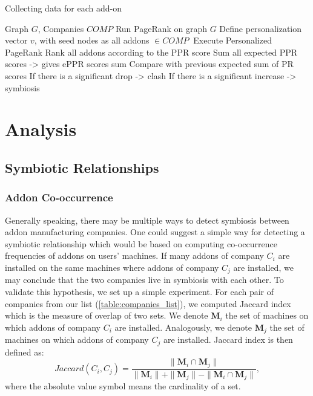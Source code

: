 \documentclass[11pt,oneside]{book}
\let\Oldsection\section
\renewcommand{\section}{\FloatBarrier\Oldsection}
\let\Oldsubsection\subsection
\renewcommand{\subsection}{\FloatBarrier\Oldsubsection}
\let\Oldsubsubsection\subsubsection
\renewcommand{\subsubsection}{\FloatBarrier\Oldsubsubsection}
\begin{document}
\begin{algorithm}[!t]
\caption{Collecting data for each add-on}
\label{alg:collect_addon_data}
\begin{algorithmic}[1] 
\REQUIRE Graph $G$, Companies $COMP$
\STATE Run PageRank on graph $G$
\STATE Define personalization vector $v$, with seed nodes as all addons $\in COMP\ $
\STATE Execute Personalized PageRank
\STATE Rank all addons according to the PPR score
\STATE Sum all expected PPR scores -> gives ePPR scores sum
\STATE Compare with previous expected sum of PR scores
\STATE If there is a significant drop -> clash
\STATE If there is a significant increase -> symbiosis
\ENDFOR
\ENDFOR
\end{algorithmic}
\end{algorithm}

\section{Analysis}
\subsection{Symbiotic Relationships}
\label{sec:symb_relations}

\subsubsection{Addon Co-occurrence}
\label{subsub:co_occurrence}

Generally speaking, there may be multiple ways to detect symbiosis between addon manufacturing companies. One could suggest a simple way for detecting a symbiotic relationship which would be based on computing co-occurrence frequencies of addons on users' machines. If many addons of company $C_i$ are installed on the same machines where addons of company $C_j$ are installed, we may conclude that the two companies live in symbiosis with each other. To validate this hypothesis, we set up a simple experiment. For each pair of companies from our list (\autoref{table:companies_list}), we computed Jaccard index~\citep{jaccard1912distribution} which is the measure of overlap of two sets. We denote $\mathbf{M}_i$ the set of machines on which addons of company $C_i$ are installed. Analogously, we denote $\mathbf{M}_j$ the set of machines on which addons of company $C_j$ are installed. Jaccard index is then defined as:
$$
Jaccard(C_i, C_j) = \frac{\|\mathbf{M}_i \cap \mathbf{M}_j\|}{\|\mathbf{M}_i\| + \|\mathbf{M}_j\| - \|\mathbf{M}_i \cap \mathbf{M}_j\|},
$$
where the absolute value symbol means the cardinality of a set.
\end{document}
